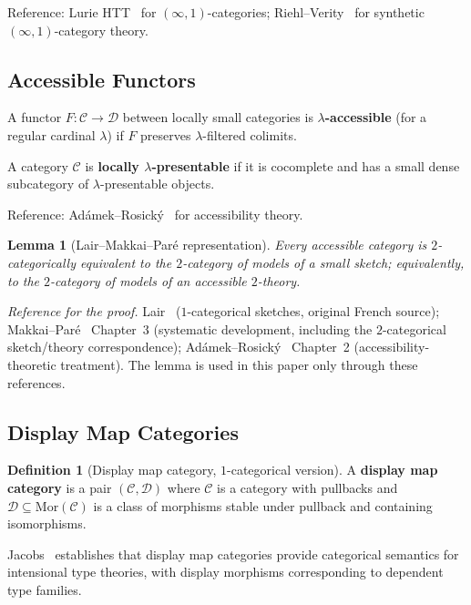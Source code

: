 \documentclass[11pt]{article}
\theoremstyle{plain}
\newtheorem{lemma}[theorem]{Lemma}
\theoremstyle{definition}
\newtheorem{definition}[theorem]{Definition}
\newcommand{\cC}{\mathcal{C}}
\newcommand{\cD}{\mathcal{D}}
\newcommand{\Mor}{\mathrm{Mor}}
\begin{document}
Reference: Lurie HTT~\cite{LurieHTT} for $(\infty, 1)$-categories; Riehl--Verity~\cite{RiehlVerity2022} for synthetic $(\infty, 1)$-category theory.

\subsection{Accessible Functors}

A functor $F : \cC \to \cD$ between locally small categories is \textbf{$\lambda$-accessible} (for a regular cardinal $\lambda$) if $F$ preserves $\lambda$-filtered colimits.

A category $\cC$ is \textbf{locally $\lambda$-presentable} if it is cocomplete and has a small dense subcategory of $\lambda$-presentable objects.

Reference: Ad\'amek--Rosick\'y~\cite{AdamekRosicky1994} for accessibility theory.

\begin{lemma}[Lair--Makkai--Par\'e representation]\label{lem:lair}
Every accessible category is $2$-categorically equivalent to the $2$-category of models of a small sketch; equivalently, to the $2$-category of models of an accessible $2$-theory.
\end{lemma}

\noindent\emph{Reference for the proof.} Lair~\cite{Lair1981} ($1$-categorical sketches, original French source); Makkai--Par\'e~\cite{MakkaiPare1989} Chapter~3 (systematic development, including the $2$-categorical sketch/theory correspondence); Ad\'amek--Rosick\'y~\cite{AdamekRosicky1994} Chapter~2 (accessibility-theoretic treatment).  The lemma is used in this paper only through these references.

\subsection{Display Map Categories}

\begin{definition}[Display map category, $1$-categorical version]\label{def:display-1cat}
A \textbf{display map category} is a pair $(\cC, \cD)$ where $\cC$ is a category with pullbacks and $\cD \subseteq \Mor(\cC)$ is a class of morphisms stable under pullback and containing isomorphisms.
\end{definition}

Jacobs~\cite{Jacobs1999} establishes that display map categories provide categorical semantics for intensional type theories, with display morphisms corresponding to dependent type families.
\end{document}
